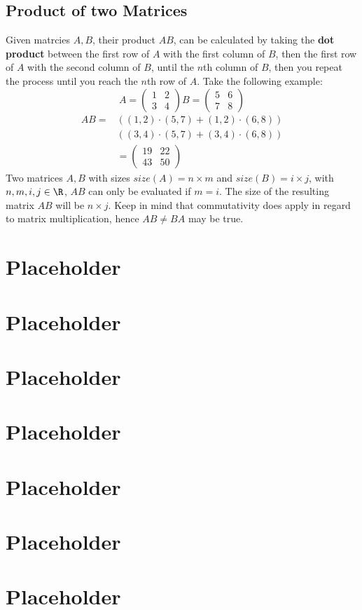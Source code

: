 \documentclass[a4paper]{article}
\begin{document}
  \subsection{Product of two Matrices}
  Given matrcies $A,B$, their product $AB$, can be calculated by taking the \textbf{dot product} between the first row of $A$ with the first column of $B$, then the first row of $A$ with the second column of $B$, until the $n$th column of $B$, then you repeat the process until you reach the $n$th row of $A$. Take the following example:
  \[
    A = \begin{pmatrix}
      1 & 2 \\ 3 & 4 
    \end{pmatrix}
    B = \begin{pmatrix}
      5 & 6 \\ 7 & 8 
    \end{pmatrix}
  \]
  \[
    \begin{split}
      AB = &((1,2) \cdot (5,7) + (1,2) \cdot (6,8))\\
         & ((3,4)\cdot (5,7) + (3,4) \cdot (6,8))\\
         &= \begin{pmatrix}
           19 & 22 \\ 43 & 50
         \end{pmatrix}
    \end{split}
  \]
  Two matrices $A,B$ with sizes $size(A) = n \times m$ and $size(B) = i \times j$, with $n,m,i,j \in \R$, $AB$ can only be evaluated if $m = i$. The size of the resulting matrix $AB$ will be $n\times j$. Keep in mind that commutativity does apply in regard to matrix multiplication, hence $AB \not = BA$ may be true.

  \section{Placeholder} 
  \section{Placeholder} 
  \section{Placeholder} 
  \section{Placeholder} 
  \section{Placeholder} 
  \section{Placeholder} 
  \section{Placeholder} 
\end{document}
